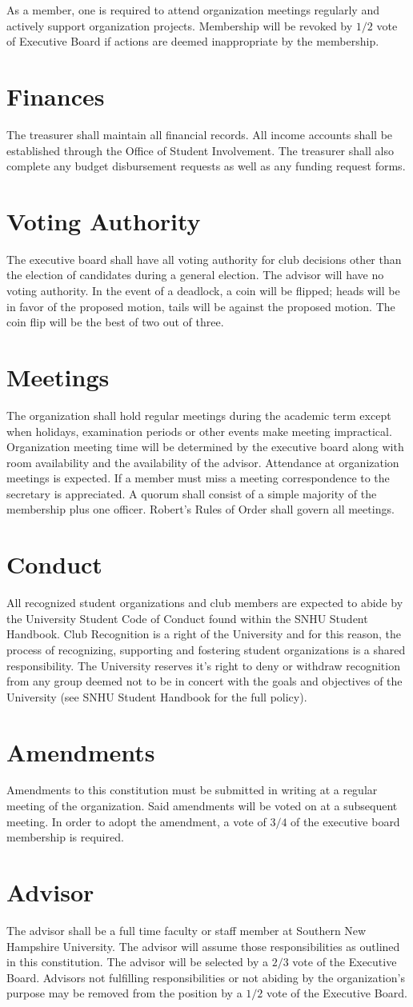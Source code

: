\documentclass{article}
\newcommand{\article}[1]{\section{#1} \label{#1}}
\begin{document}
As a member, one is required to attend organization meetings regularly and actively support organization projects. Membership will be revoked by $1/2$ vote of Executive Board if actions are deemed inappropriate by the membership.

\article{Finances}
The treasurer shall maintain all financial records. All income accounts shall be established through the Office of Student Involvement. The treasurer shall also complete any budget disbursement requests as well as any funding request forms.

\article{Voting Authority}
The executive board shall have all voting authority for club decisions other than the election of candidates during a general election. The advisor will have no voting authority. In the event of a deadlock, a coin will be flipped; heads will be in favor of the proposed motion, tails will be against the proposed motion. The coin flip will be the best of two out of three.

\article{Meetings}
The organization shall hold regular meetings during the academic term except when holidays, examination periods or other events make meeting impractical. Organization meeting time will be determined by the executive board along with room availability and the availability of the advisor. Attendance at organization meetings is expected. If a member must miss a meeting correspondence to the secretary is appreciated. A quorum shall consist of a simple majority of the membership plus one officer. Robert's Rules of Order shall govern all meetings.

\article{Conduct}
All recognized student organizations and club members are expected to abide by the University Student Code of Conduct found within the SNHU Student Handbook. Club Recognition is a right of the University and for this reason, the process of recognizing, supporting and fostering student organizations is a shared responsibility. The University reserves it's right to deny or withdraw recognition from any group deemed not to be in concert with the goals and objectives of the University (see SNHU Student Handbook for the full policy).

\article{Amendments}
Amendments to this constitution must be submitted in writing at a regular meeting of the organization. Said amendments will be voted on at a subsequent meeting. In order to adopt the amendment, a vote of $3/4$ of the executive board membership is required.

\article{Advisor}
The advisor shall be a full time faculty or staff member at Southern New Hampshire University. The advisor will assume those responsibilities as outlined in this constitution. The advisor will be selected by a $2/3$ vote of the Executive Board. Advisors not fulfilling responsibilities or not abiding by the organization's purpose may be removed from the position by a $1/2$ vote of the Executive Board.
\end{document}
